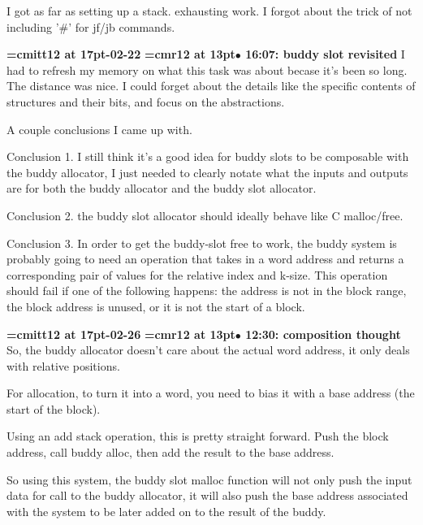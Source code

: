 I got as far as setting up a stack. exhausting work. I forgot about the trick of not including '\#' for jf/jb commands.
\par

{\medskip\noindent\bf\font\titlefont=cmitt12 at 17pt-02-22}\medskip
{\smallskip\noindent\bf\font\titlefont=cmr12 at 13pt\titlefont $\bullet$ 16:07: buddy slot revisited}\smallskip
I had to refresh my memory on what this task was about becase it's been so long. The distance was nice. I could forget about the details like the specific contents of structures and their bits, and focus on the abstractions.
\par

A couple conclusions I came up with.
\par

Conclusion 1. I still think it's a good idea for buddy slots to be composable with the buddy allocator, I just needed to clearly notate what the inputs and outputs are for both the buddy allocator and the buddy slot allocator.
\par

Conclusion 2. the buddy slot allocator should ideally behave like C malloc/free.
\par

Conclusion 3. In order to get the buddy-slot free to work, the buddy system is probably going to need an operation that takes in a word address and returns a corresponding pair of values for the relative index and k-size. This operation should fail if one of the following happens: the address is not in the block range, the block address is unused, or it is not the start of a block.
\par

{\medskip\noindent\bf\font\titlefont=cmitt12 at 17pt-02-26}\medskip
{\smallskip\noindent\bf\font\titlefont=cmr12 at 13pt\titlefont $\bullet$ 12:30: composition thought }\smallskip
So, the buddy allocator doesn't care about the actual word address, it only deals with relative positions.
\par

For allocation, to turn it into a word, you need to bias it with a base address (the start of the block).
\par

Using an add stack operation, this is pretty straight forward. Push the block address, call buddy alloc, then add the result to the base address.
\par

So using this system, the buddy slot malloc function will not only push the input data for call to the buddy allocator, it will also push the base address associated with the system to be later added on to the result of the buddy.
\par


